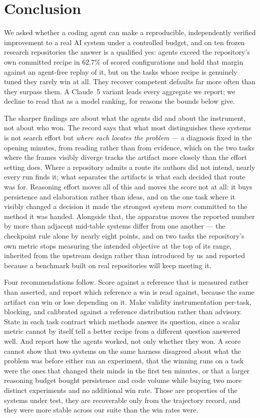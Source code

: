 \section{Conclusion}
\label{sec:conclusion}

We asked whether a coding agent can make a reproducible, independently verified improvement to a real
AI system under a controlled budget, and on ten frozen research repositories the answer is a qualified
yes: agents exceed the repository's own committed recipe in $62.7\%$ of scored configurations and hold
that margin against an agent-free replay of it, but on the tasks whose recipe is genuinely tuned they
rarely win at all. They recover competent defaults far more often than they surpass them. A Claude~5 variant leads every aggregate we report; we decline to read that as a
model ranking, for reasons the bounds below give.

The sharper findings are about what the agents did and about the instrument, not about who won. The record says that what most distinguishes these systems is not search effort but
\emph{where each locates the problem} --- a diagnosis fixed in the opening minutes, from reading
rather than from evidence, which on the two tasks where the frames visibly diverge tracks the artifact
more closely than the effort setting does. Where a repository admits a route its authors did not
intend, nearly every run finds it; what separates the artifacts is what each decided that route was
for. Reasoning effort moves all of this and moves the score not at all: it buys persistence and
elaboration rather than ideas, and on the one task where it visibly changed a decision it made the
strongest system \emph{more} committed to the method it was handed. Alongside that, the apparatus
moves the reported number by more than adjacent mid-table systems differ from one another --- the
checkpoint rule alone by nearly eight points, and on two tasks the repository's own metric stops
measuring the intended objective at the top of its range, inherited from the upstream design rather
than introduced by us and reported because a benchmark built on real repositories will keep meeting it.

Four recommendations follow. Score against a reference that is measured rather than asserted, and report which reference a win is
read against, because the same artifact can win or lose depending on it. Make validity instrumentation
per-task, blocking, and calibrated against a reference distribution rather than advisory. State in
each task contract which methods answer its question, since a scalar metric cannot by itself tell a
better recipe from a different question answered well. And report how the agents worked, not only whether
they won. A score cannot show that two systems on the same harness disagreed about what the problem
was before either ran an experiment, that the winning runs on a task were the ones that changed their
minds in the first ten minutes, or that a larger reasoning budget bought persistence and code volume
while buying two more distinct experiments and no additional win rate. Those are properties of the systems under test, they are
recoverable only from the trajectory record, and they were more stable across our suite than the win
rates were.

